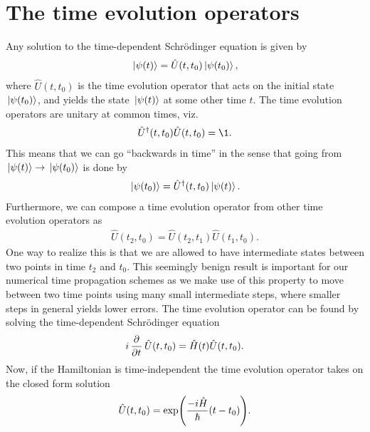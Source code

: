     \section{The time evolution operators}
        \label{sec:time-evolution-operators}
        Any solution to the time-dependent Schrödinger equation is given by
        \begin{align}
            \ket*{\psi(t)} = \hat{U}(t, t_0)\ket*{\psi(t_0)},
        \end{align}
        where $\hat{U}(t, t_0)$ is the time evolution operator that acts on the
        initial state $\ket*{\psi(t_0)}$, and yields the state $\ket*{\psi(t)}$ at
        some other time $t$.
        The time evolution operators are unitary at common times, viz.
        \begin{align}
            \hat{U}^{\dagger}(t, t_0)\hat{U}(t, t_0) = \1.
        \end{align}
        This means that we can go ``backwards in time'' in the sense that going
        from $\ket*{\psi(t)} \to \ket*{\psi(t_0)}$ is done by
        \begin{align}
            \ket*{\psi(t_0)} = \hat{U}^{\dagger}(t, t_0)\ket*{\psi(t)}.
        \end{align}
        Furthermore, we can compose a time evolution operator from other time
        evolution operators as
        \begin{align}
            \hat{U}(t_2, t_0) = \hat{U}(t_2, t_1)\hat{U}(t_1, t_0).
        \end{align}
        One way to realize this is that we are allowed to have intermediate
        states between two points in time $t_2$ and $t_0$.
        This seemingly benign result is important for our numerical time
        propagation schemes as we make use of this property to move between
        two time points using many small intermediate steps, where smaller steps
        in general yields lower errors.
        The time evolution operator can be found by solving the time-dependent
        Schrödinger equation
        \begin{gather}
            i\dpd{}{t}\hat{U}(t, t_0) = \hamil(t)\hat{U}(t, t_0).
        \end{gather}
        Now, if the Hamiltonian is time-independent the time evolution operator
        takes on the closed form solution
        \begin{align}
            \hat{U}(t, t_0) = \exp(
                \frac{-i \hat{H}}{\hslash} (t - t_0)
            ).
            \label{eq:ti-evolution}
        \end{align}
